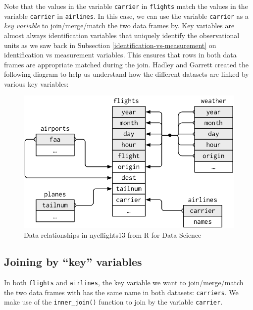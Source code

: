 \documentclass[12pt,]{krantz}
\theoremstyle{definition}
\theoremstyle{definition}
\theoremstyle{definition}
\theoremstyle{remark}
\begin{document}
Note that the values in the variable \texttt{carrier} in
\texttt{flights} match the values in the variable \texttt{carrier} in
\texttt{airlines}. In this case, we can use the variable
\texttt{carrier} as a \emph{key variable} to join/merge/match the two
data frames by. Key variables are almost always identification variables
that uniquely identify the observational units as we saw back in
Subsection \ref{identification-vs-measurement} on identification vs
measurement variables. This ensures that rows in both data frames are
appropriate matched during the join. Hadley and Garrett \citep{rds2016}
created the following diagram to help us understand how the different
datasets are linked by various key variables:

\begin{figure}

{\centering \includegraphics[width=\textwidth]{images/relational-nycflights} 

}

\caption{Data relationships in nycflights13 from R for Data Science}\label{fig:reldiagram}
\end{figure}

\subsection{\texorpdfstring{Joining by ``key''
variables}{Joining by key variables}}\label{joining-by-key-variables}

In both \texttt{flights} and \texttt{airlines}, the key variable we want
to join/merge/match the two data frames with has the same name in both
datasets: \texttt{carriers}. We make use of the \texttt{inner\_join()}
function to join by the variable \texttt{carrier}.
\end{document}
